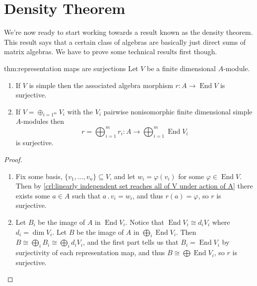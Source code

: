 \documentclass[fleqn]{NotesClass}
\DeclareMathOperator{\End}{End}
\newcommand{\action}{\mathbin{.}}
\newcommand{\isomorphic}{\cong}
\begin{document}
    \section{Density Theorem}
    We're now ready to start working towards a result known as the density theorem.
    This result says that a certain class of algebras are basically just direct sums of matrix algebras.
    We have to prove some technical results first though.
    
    \begin{thm}{}{thm:representation maps are surjections}
        Let \(V\) be a finite dimensional \(A\)-module.
        \begin{enumerate}
            \item If \(V\) is simple then the associated algebra morphism \(r \colon A \to \End V\) is surjective.
            \item If \(V = \oplus_{i=1^m} V_i\) with the \(V_i\) pairwise nonisomorphic finite dimensional simple \(A\)-modules then
            \begin{equation}
                r = \bigoplus_{i=1}^m r_i \colon A \to \bigoplus_{i=1}^m \End V_i
            \end{equation}
            is surjective.
        \end{enumerate}
        \begin{proof}
            \begin{enumerate}
                \item Fix some basis, \(\{v_1, \dotsc, v_n\} \subseteq V\), and let \(w_i = \varphi(v_i)\) for some \(\varphi \in \End V\).
                Then by \cref{crl:linearly independent set reaches all of V under action of A} there exists some \(a \in A\) such that \(a \action v_i = w_i\), and thus \(r(a) = \varphi\), so \(r\) is surjective.
                \item Let \(B_i\) be the image of \(A\) in \(\End V_i\).
                Notice that \(\End V_i \isomorphic d_i V_i\) where \(d_i = \dim V_i\).
                Let \(B\) be the image of \(A\) in \(\bigoplus_i \End V_i\).
                Then \(B \isomorphic \bigoplus_i B_i \isomorphic \bigoplus_i d_i V_i\), and the first part tells us that \(B_i = \End V_i\) by surjectivity of each representation map, and thus \(B \isomorphic \bigoplus \End V_i\), so \(r\) is surjective.
            \end{enumerate}
        \end{proof}
    \end{thm}
    
\end{document}
